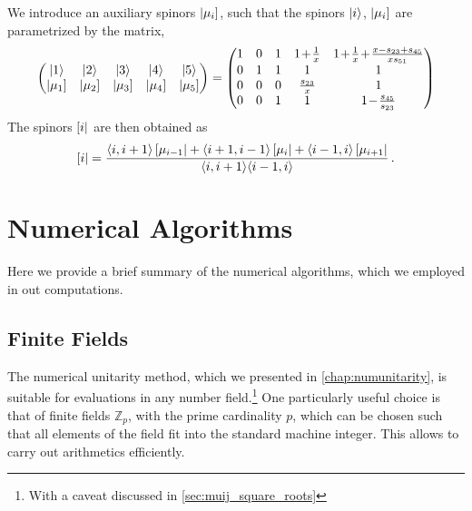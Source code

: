 We introduce an auxiliary spinors $\left\vert \mu_i \right]$,
such that the spinors $\ket{i}$, $\left\vert \mu_i \right]$ are parametrized by the matrix,
\begin{equation}
  \begin{pmatrix}
    \ket{1} &  \ket{2} &   \ket{3} &   \ket{4} &  
    \ket{5} \\   
    \sket{\mu_1} &  
    \sket{\mu_2} &  
    \sket{\mu_3} &  
    \sket{\mu_4} &  
    \sket{\mu_5} 
  \end{pmatrix}
  =
  \begin{pmatrix}
    1 & 0 & 1 & 1 \!+\! \frac{1}{x}  &  1 \!+\! \frac{1}{x} \!+\! \frac{x-s_{23}+s_{45}}{x s_{51}}\\
    0 & 1 & 1 & 1                    &  1\\
    0 & 0 & 0 & \frac{s_{23}}{x}     &  1\\
    0 & 0 & 1 & 1                    & 1 \!-\! \frac{s_{45}}{s_{23}}
  \end{pmatrix}
  \label{eq:TwistorParametrization}
\end{equation}
%
The spinors $\left[ i \right\vert$ are then obtained as
\begin{equation}
\left[ i \right\vert = \frac{\langle i, i+1 \rangle \left[ \mu_{i-1} \right\vert + \langle i+1, i-1\rangle \left[ \mu_{i} \right\vert + \langle i-1, i \rangle\left[ \mu_{i+1} \right\vert}{\langle i, i+1\rangle \langle i-1, i\rangle}\, .
\end{equation}





\chapter{Numerical Algorithms}

Here we provide a brief summary of the numerical algorithms, which we employed in out computations.


\section{Finite Fields}
\label{sec:ff_fp}

The numerical unitarity method, which we presented in \cref{chap:numunitarity}, is suitable 
for evaluations in any number field.\footnote{
  With a caveat discussed in \cref{sec:muij_square_roots}
}
One particularly useful choice is that of finite fields $\mathbb{Z}_p$, with the prime cardinality $p$,
which  can be chosen such that all elements of the field fit into the standard machine integer.
This allows to carry out arithmetics efficiently.

